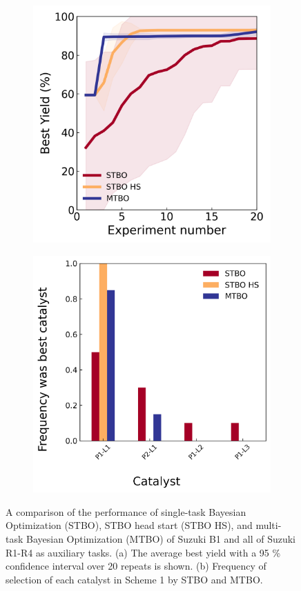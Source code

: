 \begin{figure}
    \centering
    \begin{subfigure}
        \centering
        \includegraphics[width=0.8\linewidth]{gfx/Chapter03/baumgartner_suzuki_reizman_suzuki_all_cotraining_optimization.png}
    \end{subfigure} 
    \begin{subfigure}
        \centering
        \includegraphics[width=0.8\linewidth]{gfx/Chapter03/baumgartner_suzuki_reizman_suzuki_all_cotraining_optimization_catalyst_best.png}
    \end{subfigure}
    \caption{ A comparison of the performance of single-task Bayesian Optimization (STBO), STBO head start (STBO HS), and multi-task Bayesian Optimization (MTBO) of Suzuki B1 and all of Suzuki R1-R4 as auxiliary tasks. (a)  The average best yield with a 95 \% confidence interval over 20 repeats is shown.  (b) Frequency of selection of each catalyst in Scheme 1 by STBO and MTBO.}
    \label{fig:baumgartner_suzuki_reizman_suzuki_all_cotraining_optimization}
\end{figure}

